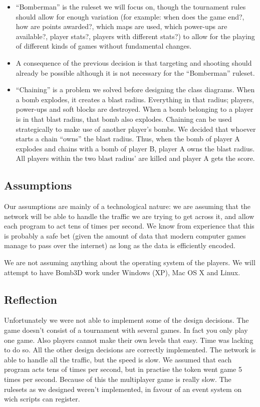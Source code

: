 \begin{itemize}
        \item ``Bomberman'' is the ruleset we will focus on, though the tournament rules should allow for enough variation (for example: when does the game end?, how are points awarded?, which maps are used, which power-ups are available?, player stats?, players with different stats?) to allow for the playing of different kinds of games without fundamental changes.

        \item A consequence of the previous decision is that targeting and shooting should already be possible although it is not necessary for the ``Bomberman'' ruleset.

        \item ``Chaining'' is a problem we solved before designing the class diagrams. When a bomb explodes, it creates a blast radius. Everything in that radius; players, power-ups and soft blocks are destroyed. When a bomb belonging to a player is in that blast radius, that bomb also explodes. Chaining can be used strategically to make use of another player's bombs. We decided that whoever starts a chain ``owns'' the blast radius. Thus, when the bomb of player A explodes and chains with a bomb of player B, player A owns the blast radius. All players within the two blast radius' are killed and player A gets the score.

    \end{itemize}

    \subsection{Assumptions}

    Our assumptions are mainly of a technological nature: we are assuming that the network will be able to handle the traffic we are trying to get across it, and allow each program to act tens of times per second. We know from experience that this is probably a safe bet (given the amount of data that modern computer games manage to pass over the internet) as long as the data is efficiently encoded.

    We are not assuming anything about the operating system of the players. We will attempt to have Bomb3D work under Windows (XP), Mac OS X and Linux.
    

    \subsection{Reflection}
    Unfortunately we were not able to implement some of the design decisions. The game doesn't consist of a tournament with several games. In fact you only play one game. Also players cannot make their own levels that easy. Time was lacking to do so. All the other design decisions are correctly implemented.
    The network is able to handle all the traffic, but the speed is slow. We assumed that each program acts tens of times per second, but in practise the token went game 5 times per second. Because of this the multiplayer game is really slow. The rulesets as we designed weren't implemented, in favour of an event system on wich scripts can register.

